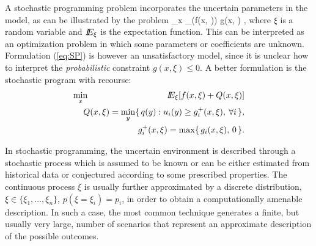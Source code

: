 A stochastic programming problem incorporates the uncertain parameters
in the model, as can be illustrated by the problem
%
\be \label{eq:SP}
\min_x \E_\xi(f(x, \xi)) \;\; g(x, \xi) ,
\ee
%
where $\xi$ is a random variable and $I\!\!E_\xi$ is the expectation function.
This can be interpreted as an optimization
problem in which some parameters or coefficients are unknown.
Formulation (\ref{eq:SP}) is however an unsatisfactory model, since
it is unclear how to interpret the {\em probabilistic} constraint
$g(x,\xi) \le 0$. A better formulation is the stochastic program
with recourse:
%
\begin{eqnarray} \label{eq:SPRecourse}
\min_x \hspace{-1.5em} && \E_\xi[f(x, \xi) + Q(x, \xi)] \nonumber \\ 
  && Q(x,\xi) = \min_y \{\, q(y) : u_i(y) \ge g_i^+(x, \xi),\:\forall i \,\},\\
  && g_i^+(x, \xi) = \max \{\, g_i(x, \xi), \, 0 \,\}. \nonumber
\end{eqnarray}


In stochastic programming, the uncertain environment is 
described through a stochastic process which is assumed to be 
known or can be either estimated from historical data or 
conjectured according to some prescribed properties. The 
continuous process $\xi$ is usually further approximated by a discrete 
distribution, $\xi \in \{\xi_1, \ldots,\xi_n\}$, $p(\xi=\xi_i) = p_i$,
in order to obtain a computationally amenable description. 
%
In such a case, the most common technique generates a 
finite, but usually very large, number of scenarios that represent an 
approximate description of the possible outcomes.


